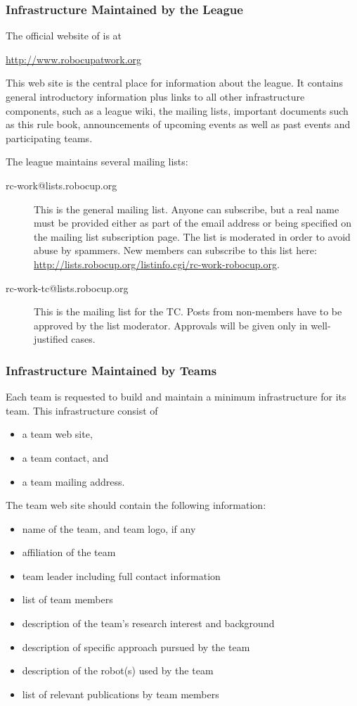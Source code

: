 \subsubsection{Infrastructure Maintained by the League}
The official website of \RCAW is at

\url{http://www.robocupatwork.org}

This web site is the central place for information about the league. It contains general introductory information plus links to all other infrastructure components, such as a league wiki, the mailing lists, important documents such as this rule book, announcements of upcoming events as well as past events and participating teams.
\par
The league maintains several mailing lists:
\begin{description}
	\item[rc-work@lists.robocup.org] This is the general \RCAW mailing list. Anyone can subscribe, but a real name must be provided either as part of the email address or being specified on the mailing list subscription page. The list is moderated in order to avoid abuse by spammers. New members can subscribe to this list here: \url{http://lists.robocup.org/listinfo.cgi/rc-work-robocup.org}.

	\item[rc-work-tc@lists.robocup.org] This is the mailing list for the TC. Posts from non-members have to be approved by the list moderator. Approvals will be given only in well-justified cases.
\end{description}

\subsubsection{Infrastructure Maintained by Teams}
Each team is requested to build and maintain a minimum infrastructure for its team. This infrastructure consist of 

\begin{itemize}
	\item a team web site,
	\item a team contact, and
	\item a team mailing address.
\end{itemize}

The team web site should contain the following information:

\begin{itemize}
	\item name of the team, and team logo, if any
	\item affiliation of the team
	\item team leader including full contact information
	\item list of team members
	\item description of the team's research interest and background
	\item description of specific approach pursued by the team
	\item description of the robot(s) used by the team
	\item list of relevant publications by team members

\end{itemize}

